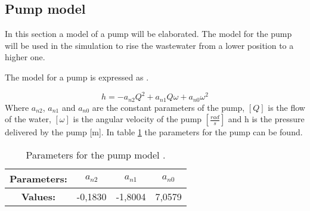 \subsection{Pump model}\label{se:pump_model}
In this section a model of a pump will be elaborated. The model for the pump will be used in the simulation to rise the wastewater from a lower position to a higher one. 

 The model for a pump is expressed as \cite{kallesoe_pump}.

\begin{equation}\label{sec:eq_pump_exp}
h= -a_{n2}Q^2+a_{n1}Q\omega+a_{n0}\omega^2
\end{equation}
Where $a_{n2}$, $a_{n1}$ and $a_{n0}$ are the constant parameters of the pump, $[Q]$ is the flow of the water, $[\omega]$ is the angular velocity of the pump $[\frac{rad}{s}]$ and h is the pressure delivered by the pump [m]. In table \ref{tab:pump_parameters} the parameters for the pump can be found.

\begin{table}[H]
\centering
\begin{tabular}{|c|c|c|c|}
\hline
\rowcolor[HTML]{9B9B9B} 
\textbf{Parameters:}                     & \textbf{$a_{n2}$} & \textbf{$a_{n1}$} & \textbf{$a_{n0}$} \\ \hline
\cellcolor[HTML]{9B9B9B}\textbf{Values:} & -0,1830           & -1,8004            & 7,0579              \\ \hline
\end{tabular}
\caption{Parameters for the pump model \cite{kallesoe_pump}.}
\label{tab:pump_parameters}
\end{table}